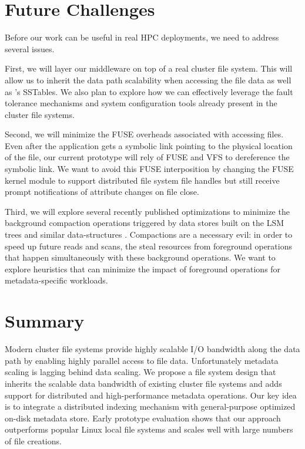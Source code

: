 \section{Future Challenges}
\label{futurework}

Before our work can be useful in real HPC deployments, we need to address
several issues. 

First, we will layer our middleware on top of a real cluster file system.
This will allow us to inherit the data path scalability when accessing the 
file data as well as \ldb's SSTables. We also plan to explore how
we can effectively leverage the fault tolerance mechanisms and system
configuration tools already present in the cluster file systems.

Second, we will minimize the FUSE overheads associated with accessing files.
Even after the application gets a symbolic link pointing to the physical
location of the file, our current prototype will rely of FUSE and VFS to
dereference the symbolic link. We want to avoid this FUSE
interposition by changing the FUSE kernel module to support distributed file
system file handles but still receive prompt notifications of attribute changes
on file close.

Third, we will explore several recently published optimizations to minimize the
background compaction operations triggered by data stores built on the LSM
trees and similar data-structures \cite{Bender2007, tokufs, blsm}.
Compactions are a necessary evil: in order to speed up future reads and
scans, the steal resources from foreground operations that happen
simultaneously with these background operations. We want to explore heuristics
that can minimize the impact of foreground operations for metadata-specific
workloads.

\section{Summary}
\label{summary}

Modern cluster file systems provide highly scalable I/O bandwidth along the
data path by enabling highly parallel access to file data.
Unfortunately metadata scaling is lagging behind data scaling.
We propose a file system design that 
inherits the scalable data bandwidth of existing cluster file systems
and adds support for distributed and high-performance metadata operations.
Our key idea is to integrate a distributed indexing mechanism with general-purpose
optimized on-disk metadata store.
Early prototype evaluation shows that our approach outperforms popular Linux
local file systems and scales well with large numbers of file creations. 




